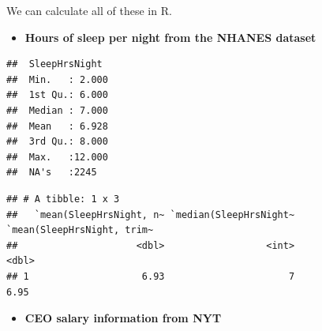 \documentclass[]{book}
\newenvironment{Shaded}{\begin{snugshade}}{\end{snugshade}}
\newcommand{\CommentTok}[1]{\textcolor[rgb]{0.56,0.35,0.01}{\textit{#1}}}
\newcommand{\DataTypeTok}[1]{\textcolor[rgb]{0.13,0.29,0.53}{#1}}
\newcommand{\FloatTok}[1]{\textcolor[rgb]{0.00,0.00,0.81}{#1}}
\newcommand{\KeywordTok}[1]{\textcolor[rgb]{0.13,0.29,0.53}{\textbf{#1}}}
\newcommand{\NormalTok}[1]{#1}
\newcommand{\OperatorTok}[1]{\textcolor[rgb]{0.81,0.36,0.00}{\textbf{#1}}}
\newcommand{\OtherTok}[1]{\textcolor[rgb]{0.56,0.35,0.01}{#1}}
\newcommand{\StringTok}[1]{\textcolor[rgb]{0.31,0.60,0.02}{#1}}
\providecommand{\tightlist}{%
  \setlength{\itemsep}{0pt}\setlength{\parskip}{0pt}}
\begin{document}
We can calculate all of these in R.

\begin{itemize}
\tightlist
\item
  \textbf{Hours of sleep per night from the NHANES dataset}
\end{itemize}

\begin{Shaded}
\end{Shaded}

\begin{verbatim}
##  SleepHrsNight   
##  Min.   : 2.000  
##  1st Qu.: 6.000  
##  Median : 7.000  
##  Mean   : 6.928  
##  3rd Qu.: 8.000  
##  Max.   :12.000  
##  NA's   :2245
\end{verbatim}

\begin{Shaded}
\end{Shaded}

\begin{verbatim}
## # A tibble: 1 x 3
##   `mean(SleepHrsNight, n~ `median(SleepHrsNight~ `mean(SleepHrsNight, trim~
##                     <dbl>                  <int>                      <dbl>
## 1                    6.93                      7                       6.95
\end{verbatim}

\begin{itemize}
\tightlist
\item
  \textbf{CEO salary information from NYT}
\end{itemize}

\begin{Shaded}
\end{Shaded}
\end{document}
